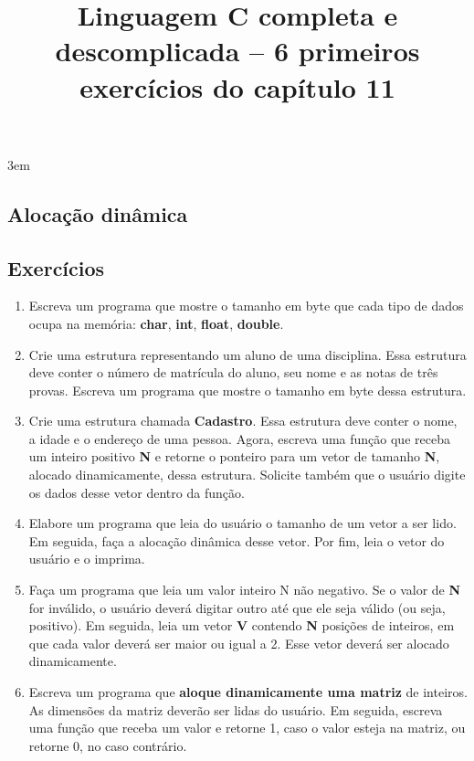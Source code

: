 \documentclass[a4paper,10pt]{article}
\title{Linguagem C completa e descomplicada -- 6 primeiros exercícios do capítulo 11}
\begin{document}
\maketitle

\emergencystretch 3em

\begin{multicols*}{2}
\setcounter{section}{10}
\section{Alocação dinâmica}

\setcounter{subsection}{3}
\subsection{Exercícios}

\setlength{\leftmargini}{0pt}
\begin{enumerate}
  \item Escreva um programa que mostre o tamanho em byte que cada tipo de dados ocupa na memória: \textbf{char}, \textbf{int}, \textbf{float}, \textbf{double}.
  \item Crie uma estrutura representando um aluno de uma disciplina. Essa estrutura deve conter o número de matrícula do aluno, seu nome e as notas de três provas. Escreva um programa que mostre o tamanho em byte dessa estrutura.
  \item Crie uma estrutura chamada \textbf{Cadastro}. Essa estrutura deve conter o nome, a idade e o endereço de uma pessoa. Agora, escreva uma função que receba um inteiro positivo \textbf{N} e retorne o ponteiro para um vetor de tamanho \textbf{N}, alocado dinamicamente, dessa estrutura. Solicite também que o usuário digite os dados desse vetor dentro da função.
  \item Elabore um programa que leia do usuário o tamanho de um vetor a ser lido. Em seguida, faça a alocação dinâmica desse vetor. Por fim, leia o vetor do usuário e o imprima.
  \item Faça um programa que leia um valor inteiro N não negativo. Se o valor de \textbf{N} for inválido, o usuário deverá digitar outro até que ele seja válido (ou seja, positivo). Em seguida, leia um vetor \textbf{V} contendo \textbf{N} posições de inteiros, em que cada valor deverá ser maior ou igual a 2. Esse vetor deverá ser alocado dinamicamente.
  \item Escreva um programa que \textbf{aloque dinamicamente uma matriz} de inteiros. As dimensões da matriz deverão ser lidas do usuário. Em seguida, escreva uma função que receba um valor e retorne 1, caso o valor esteja na matriz, ou retorne 0, no caso contrário.
\end{enumerate}
\end{multicols*}
\end{document}
